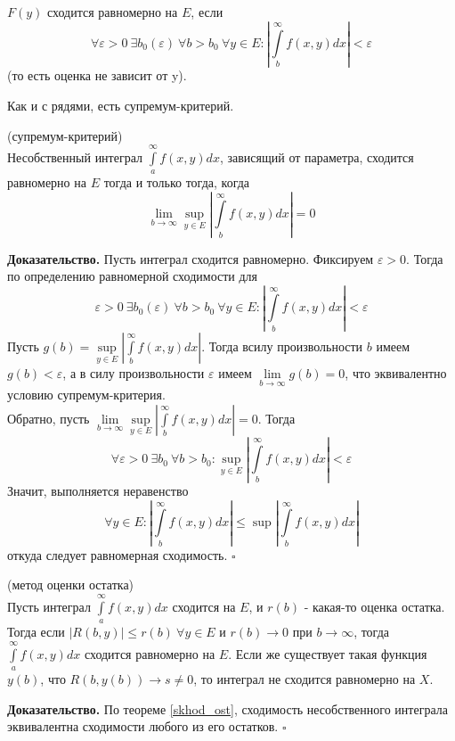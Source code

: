 \begin{defin}
$F(y)$ сходится равномерно на $E$, если
$$\forall \varepsilon>0~\exists b_0(\varepsilon)~\forall b>b_0~\forall y\in E:
\left| \int\limits_{b}^{\infty}f(x,y)dx\right|<\varepsilon$$
(то есть оценка не зависит от y).
\end{defin}
Как и с рядями, есть супремум-критерий.
\begin{theor}
    (супремум-критерий)\\
    Несобственный интеграл $\int\limits_{a}^{\infty} f(x,y)dx$, зависящий от
    параметра, сходится равномерно на $E$ тогда и только тогда, когда
    $$\lim\limits_{b\to \infty}\sup\limits_{y\in  E}\left| 
    \int\limits_{b}^{\infty}f(x,y)dx \right|=0$$
\end{theor}
\textbf{Доказательство.} Пусть интеграл сходится равномерно. Фиксируем
$\varepsilon>0$. Тогда по определению равномерной сходимости для
$${\varepsilon}>0~\exists b_0(\varepsilon)~\forall b>b_0~
\forall y\in E:
\left| \int\limits_{b}^{\infty}f(x,y)dx\right|<\varepsilon$$
Пусть 
$g(b)=\sup\limits_{y\in E}\left| \int\limits_{b}^{\infty}f(x,y)dx\right|$.
Тогда всилу произвольности $b$ имеем $g(b)<\varepsilon$, а в силу 
произвольности $\varepsilon$ имеем
$\lim\limits_{b \to \infty}g(b)=0$, что эквивалентно условию 
супремум-критерия.\\
Обратно, пусть $\lim\limits_{b\to \infty}\sup\limits_{y\in  E}\left| 
\int\limits_{b}^{\infty}f(x,y)dx \right|=0$. Тогда 
$$\forall \varepsilon>0~\exists b_0~\forall b>b_0:\sup\limits_{y\in E}
\left|\int\limits_{b}^{\infty}f(x,y)dx\right|<\varepsilon$$
Значит, выполняется неравенство 
$$\forall  y\in E:\left|\int\limits_{b}^{\infty}f(x,y)dx \right|\leqslant
\sup\left|\int\limits_{b}^{\infty}f(x,y)dx \right|$$ 
откуда следует равномерная сходимость. $\square$ 


\begin{theor} (метод оценки остатка)\\
Пусть интеграл $\int\limits_{a}^{\infty} f(x,y)dx$ сходится на $E$, и 
$r(b)$ - какая-то оценка остатка. Тогда если
 $|R(b,y)|\leqslant r(b)~\forall y\in E$ и $r(b)\to 0$ при  $b\to \infty$,
 тогда $\int\limits_{a}^{\infty}f(x,y)dx$ сходится равномерно на 
 $E$. Если же существует такая функция  $y(b)$, что $R(b,y(b))\to s\ne 0$,
 то интеграл не сходится равномерно на $X$.
\end{theor}
\textbf{Доказательство.} По теореме \ref{skhod_ost}, сходимость несобственного
интеграла эквивалентна сходимости любого из его остатков. $\square$


